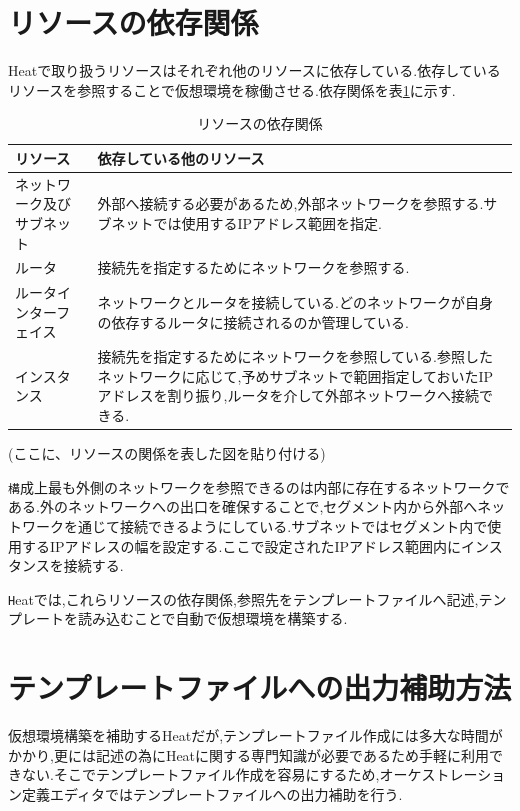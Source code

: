 \documentclass[mingoth]{kut-paper}		%
\begin{document}
	\section{リソースの依存関係}
	Heatで取り扱うリソースはそれぞれ他のリソースに依存している.依存しているリソースを参照することで仮想環境を稼働させる.依存関係を表\ref{table:4}に示す.
	\begin{table}[H]
		\begin{center}
			\caption{リソースの依存関係}
			\label{table:4}
			\begin{tabular}{|p{5cm}|p{7cm}|}\hline
				リソース & 依存している他のリソース\\ \hline \hline
				ネットワーク及びサブネット & 外部へ接続する必要があるため,外部ネットワークを参照する.サブネットでは使用するIPアドレス範囲を指定.\\ \hline
				ルータ & 接続先を指定するためにネットワークを参照する.\\ \hline
				ルータインターフェイス & ネットワークとルータを接続している.どのネットワークが自身の依存するルータに接続されるのか管理している.\\ \hline
				インスタンス & 接続先を指定するためにネットワークを参照している.参照したネットワークに応じて,予めサブネットで範囲指定しておいたIPアドレスを割り振り,ルータを介して外部ネットワークへ接続できる.\\ \hline
			\end{tabular}
		\end{center}
	\end{table}
	(ここに、リソースの関係を表した図を貼り付ける)
	
	\texttt 
	構成上最も外側のネットワークを参照できるのは内部に存在するネットワークである.外のネットワークへの出口を確保することで,セグメント内から外部へネットワークを通じて接続できるようにしている.サブネットではセグメント内で使用するIPアドレスの幅を設定する.ここで設定されたIPアドレス範囲内にインスタンスを接続する.
	
	\texttt Heatでは,これらリソースの依存関係,参照先をテンプレートファイルへ記述,テンプレートを読み込むことで自動で仮想環境を構築する.
	\section{テンプレートファイルへの出力補助方法}
	仮想環境構築を補助するHeatだが,テンプレートファイル作成には多大な時間がかかり,更には記述の為にHeatに関する専門知識が必要であるため手軽に利用できない.そこでテンプレートファイル作成を容易にするため,オーケストレーション定義エディタではテンプレートファイルへの出力補助を行う.
	
\end{document}
